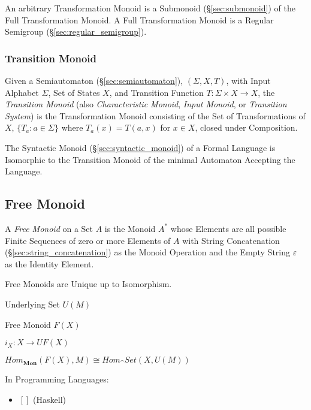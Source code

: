 An arbitrary Transformation Monoid is a Submonoid (\S\ref{sec:submonoid}) of the
Full Transformation Monoid. A Full Transformation Monoid is a Regular Semigroup
(\S\ref{sec:regular_semigroup}).



\subsubsection{Transition Monoid}\label{sec:transition_monoid}

Given a Semiautomaton (\S\ref{sec:semiautomaton}), $(\Sigma, X, T)$,
with Input Alphabet $\Sigma$, Set of States $X$, and Transition
Function $T : \Sigma \times X \rightarrow X$, the \emph{Transition
  Monoid} (also \emph{Characteristic Monoid}, \emph{Input Monoid}, or
\emph{Transition System}) is the Transformation Monoid consisting of
the Set of Transformations of $X$, $\{T_a : a \in \Sigma\}$ where
$T_a(x) = T(a,x)$ for $x \in X$, closed under Composition.

The Syntactic Monoid (\S\ref{sec:syntactic_monoid}) of a Formal
Language is Isomorphic to the Transition Monoid of the minimal
Automaton Accepting the Language.



\subsection{Free Monoid}\label{sec:free_monoid}

A \emph{Free Monoid} on a Set $A$ is the Monoid $A^*$ whose Elements
are all possible Finite Sequences of zero or more Elements of $A$ with
String Concatenation (\S\ref{sec:string_concatenation}) as the Monoid
Operation and the Empty String $\varepsilon$ as the Identity Element.

Free Monoids are Unique up to Isomorphism.

Underlying Set $U(M)$

Free Monoid $F(X)$

$i_X : X \rightarrow U F (X)$

$Hom_\mathbf{Mon}(F(X), M) \cong Hom_\cat{Set}(X, U(M))$

In Programming Languages:

\begin{itemize}
  \item $\mathtt{[]}$ (Haskell)
\end{itemize}



